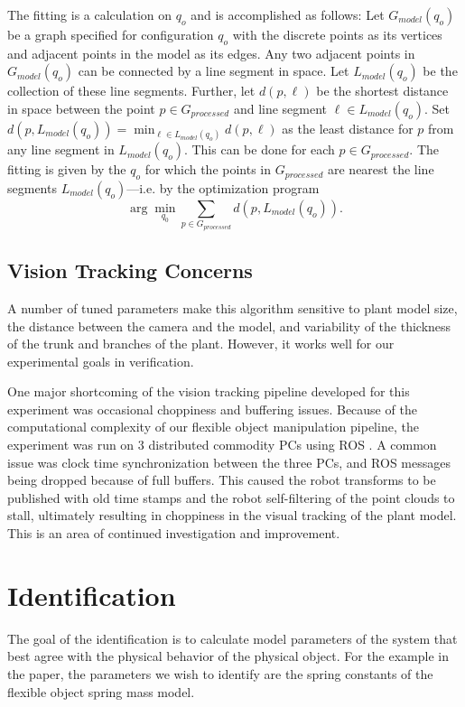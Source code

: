 \documentclass[runningheads,a4paper]{llncs}
\begin{document}
The fitting is a calculation on $q_o$ and is accomplished as follows: Let $G_{model}(q_o)$ be a graph specified for configuration $q_o$ with the discrete points as its vertices and adjacent points in the model as its edges. Any two adjacent points in $G_{model}(q_o)$ can be connected by a line segment in space. Let $L_{model}(q_o)$ be the collection of these line segments. Further, let $d(p,\ell)$ be the shortest distance in space between the point $p\in G_{processed}$ and line segment $\ell \in L_{model}(q_o)$. Set $d(p,L_{model}(q_o)) = \min_{\ell\in L_{model}(q_o)} d(p,\ell)$ as the least distance for $p$ from any line segment in $L_{model}(q_o)$. This can be done for each $p\in G_{processed}$. The fitting is given by the $q_o$ for which the points in $G_{processed}$ are nearest the line segments $L_{model}(q_o)$---i.e. by the optimization program
\begin{equation}
\arg \min_{q_0} \sum_{p\in G_{processed}} d(p,L_{model}(q_o)).
\label{eq-fit_prog}
\end{equation}

\subsection{Vision Tracking Concerns}

A number of tuned parameters make this algorithm sensitive to plant model size, the distance between the camera and the model, and variability of the thickness of the trunk and branches of the plant. However, it works well for our experimental goals in verification.

One major shortcoming of the vision tracking pipeline developed for this experiment was occasional choppiness and buffering issues. Because of the computational complexity of our flexible object manipulation pipeline, the experiment was run on 3 distributed commodity PCs using ROS \cite{quigley2009ros}. A common issue was clock time synchronization between the three PCs, and ROS messages being dropped because of full buffers. This caused the robot transforms to be published with old time stamps and the robot self-filtering of the point clouds to stall, ultimately resulting in choppiness in the visual tracking of the plant model. This is an area of continued investigation and improvement. 

\section{Identification}
The goal of the identification is to calculate model parameters of the system that best agree with the physical behavior of the physical object. For the example in the paper, the parameters we wish to identify are the spring constants of the flexible object spring mass model. 
\end{document}
